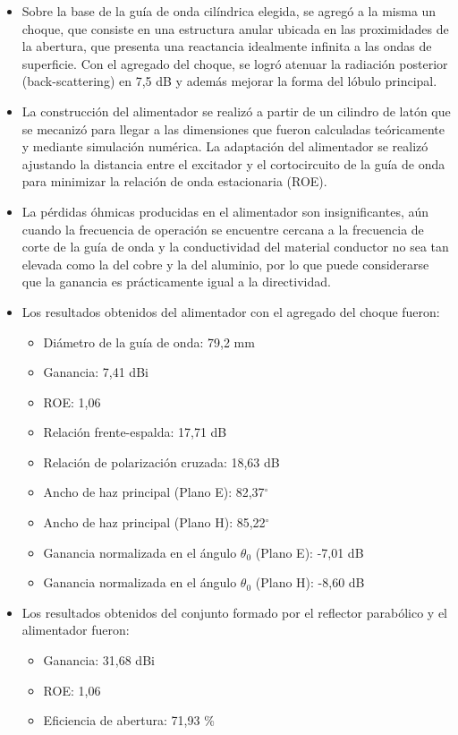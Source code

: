 \begin{itemize}
\item Sobre la base de la guía de onda cilíndrica elegida, se agregó a la misma un choque, que consiste en una estructura anular ubicada en las proximidades de la abertura, que presenta una reactancia idealmente infinita a las ondas de superficie. Con el agregado del choque, se logró atenuar la radiación posterior (back-scattering) en 7,5 dB y además mejorar la forma del lóbulo principal.
\item La construcción del alimentador se realizó a partir de un cilindro de latón que se mecanizó para llegar a las dimensiones que fueron calculadas teóricamente y mediante simulación numérica. La adaptación del alimentador se realizó ajustando la distancia entre el excitador y el cortocircuito de la guía de onda para minimizar la relación de onda estacionaria (ROE).
\item La pérdidas óhmicas producidas en el alimentador son insignificantes, aún cuando la frecuencia de operación se encuentre cercana a la frecuencia de corte de la guía de onda y la conductividad del material conductor no sea tan elevada como la del cobre y la del aluminio, por lo que puede considerarse que la ganancia es prácticamente igual a la directividad.
\item Los resultados obtenidos del alimentador con el agregado del choque fueron:
\begin{itemize}
\item Diámetro de la guía de onda: 79,2 mm
\item Ganancia: 7,41 dBi
\item ROE: 1,06
\item Relación frente-espalda: 17,71 dB
\item Relación de polarización cruzada: 18,63 dB
\item Ancho de haz principal (Plano E): 82,37$^{\circ}$
\item Ancho de haz principal (Plano H): 85,22$^{\circ}$
\item Ganancia normalizada en el ángulo $\theta_0$ (Plano E): -7,01 dB
\item Ganancia normalizada en el ángulo $\theta_0$ (Plano H): -8,60 dB
\end{itemize}
\item Los resultados obtenidos del conjunto formado por el reflector parabólico y el alimentador fueron:
\begin{itemize}
\item Ganancia: 31,68 dBi
\item ROE: 1,06
\item Eficiencia de abertura: 71,93 \%

\end{itemize}
\end{itemize}
